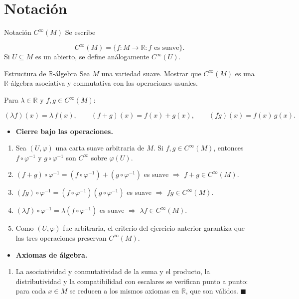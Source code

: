 \section{Notación}
\begin{bookdefinition}{Notación $C^\infty(M)$}
Se escribe

\[
C^\infty(M)=\{f:M\to\mathbb{R} : f\text{ es suave}\}.
\]
Si $U\subseteq M$ es un abierto, se define análogamente $C^\infty(U)$.

\end{bookdefinition}
\begin{bookexercise}{Estructura de $\mathbb{R}$-álgebra}
Sea $M$ una variedad suave. Mostrar que $C^\infty(M)$ es una $\mathbb{R}$-álgebra asociativa y conmutativa con las operaciones usuales.

Para $\lambda\in\mathbb{R}$ y $f,g\in C^\infty(M)$:

\[
(\lambda f)(x)=\lambda\,f(x), \qquad (f+g)(x)=f(x)+g(x), \qquad (fg)(x)=f(x)\,g(x).
\]
\end{bookexercise}
\begin{bookproof}{}
\begin{itemize}
\item \textbf{Cierre bajo las operaciones.}
\end{itemize}
\begin{enumerate}
\item Sea $(U,\varphi)$ una carta suave arbitraria de $M$. Si $f,g\in C^\infty(M)$, entonces $f\circ\varphi^{-1}$ y $g\circ\varphi^{-1}$ son $C^\infty$ sobre $\varphi(U)$.
\item $(f+g)\circ\varphi^{-1}=(f\circ\varphi^{-1})+(g\circ\varphi^{-1})$ es suave $\Rightarrow$ $f+g\in C^\infty(M)$.
\item $(fg)\circ\varphi^{-1}=(f\circ\varphi^{-1})(g\circ\varphi^{-1})$ es suave $\Rightarrow$ $fg\in C^\infty(M)$.
\item $(\lambda f)\circ\varphi^{-1}=\lambda(f\circ\varphi^{-1})$ es suave $\Rightarrow$ $\lambda f\in C^\infty(M)$.
\item Como $(U,\varphi)$ fue arbitraria, el criterio del ejercicio anterior garantiza que las tres operaciones preservan $C^\infty(M)$.
\end{enumerate}
\begin{itemize}
\item \textbf{Axiomas de álgebra.}
\end{itemize}
\begin{enumerate}
\item La asociatividad y conmutatividad de la suma y el producto, la distributividad y la compatibilidad con escalares se verifican punto a punto: para cada $x\in M$ se reducen a los mismos axiomas en $\mathbb{R}$, que son válidos. $\blacksquare$
\end{enumerate}
\bookqed
\end{bookproof}
